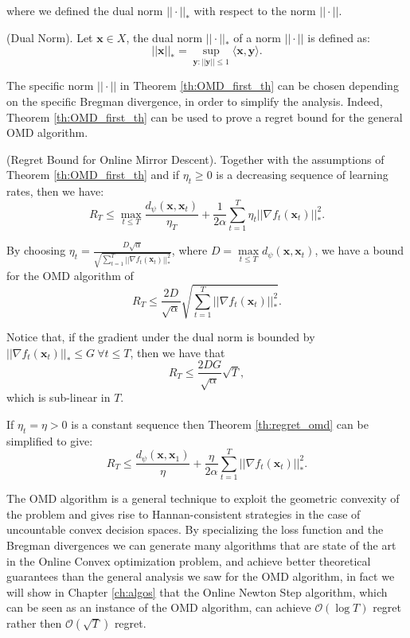 where we defined the dual norm $||\cdot||_*$ with respect to the norm $||\cdot||$.

\begin{definition}(Dual Norm).
Let $\mathbf x\in X$, the dual norm $||\cdot||_*$ of a norm $||\cdot||$ is defined as:
$$||\mathbf x||_*=\sup\limits_{\mathbf y:||\mathbf y||\le1}\langle \mathbf x,\mathbf y\rangle.$$
\end{definition}

The specific norm $||\cdot||$ in  Theorem \ref{th:OMD_first_th} can be chosen depending on the specific Bregman divergence, in order to simplify the analysis. Indeed, Theorem \ref{th:OMD_first_th} can be used to prove a regret bound for the general OMD algorithm. 

\begin{theorem}(Regret Bound for Online Mirror Descent).\label{th:regret_omd} Together with the assumptions of Theorem \ref{th:OMD_first_th} and if $\eta_t\ge0$ is a decreasing sequence of learning rates, then we have: 
$$R_T\le\max\limits_{t\le T}\frac{d_\psi(\mathbf x,\mathbf x_t)}{\eta_T}+\frac{1}{2\alpha}\sum\limits_{t=1}^T\eta_t||\nabla f_t(\mathbf x_t)||_*^2.$$
\end{theorem}


By choosing $\eta_t=\frac{D\sqrt{\alpha}}{\sqrt{\sum\limits_{t=1}^T||\nabla f_t(\mathbf x_t)||_*^2}}$, where $D=\max\limits_{t\le T}d_\psi(\mathbf x,\mathbf x_t)$, we have a bound for the OMD algorithm of 
\begin{equation}
R_T\le\frac{2D}{\sqrt\alpha}\sqrt{\sum\limits_{t=1}^T||\nabla f_t(\mathbf x_t)||_*^2}.
\end{equation}

Notice that, if the gradient under the dual norm is bounded by $||\nabla f_t(\mathbf x_t)||_*\le G\ \forall t\le T$, then we have that 
\begin{equation}
R_T\le\frac{2DG}{\sqrt\alpha}\sqrt T,
\end{equation}
which is sub-linear in $T$.

If $\eta_t=\eta>0$ is a constant sequence then Theorem \ref{th:regret_omd} can be simplified to give: 
\begin{equation}
R_T\le \frac{d_\psi(\mathbf x,\mathbf x_1)}{\eta}+\frac{\eta}{2\alpha}\sum\limits_{t=1}^T||\nabla f_t(\mathbf x_t)||^2_*.
\end{equation}

The OMD algorithm is a general technique to exploit the geometric convexity of the problem and gives rise to Hannan-consistent strategies in the case of uncountable convex decision spaces. By specializing the loss function and the Bregman divergences we can generate many algorithms that are state of the art in the Online Convex optimization problem, and achieve better theoretical guarantees than the general analysis we saw for the OMD algorithm, in fact we will show in Chapter \ref{ch:algos} that the Online Newton Step algorithm, which can be seen as an instance of the OMD algorithm, can achieve $\mathcal O(\log T)$ regret rather then $\mathcal O(\sqrt T)$ regret.

